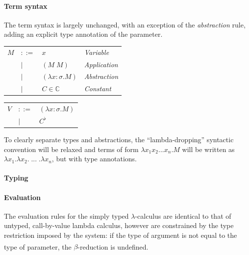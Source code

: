 \documentclass[table, a4paper, 10pt]{book}
\newcommand{\cit}[1]{\textsuperscript{\cite{#1}}}
\begin{document}
\paragraph{Term syntax}
The term syntax is largely unchanged, with an exception of
the \textit{abstraction} rule, adding an explicit type annotation of the parameter.

\begin{tabular}{llll}
$M$ &$::=$             &$x$                 & {\small\hspace{0.2cm}\textit{Variable}}\\
    &\hspace{0.1cm}$|$ &$(M\;M)$            & {\small\hspace{0.2cm}\textit{Application}}\\
    &\hspace{0.1cm}$|$ &$(\lambda x{:}\sigma.M)$     & {\small\hspace{0.2cm}\textit{Abstraction}}\\
    &\hspace{0.1cm}$|$ &$C \in \mathbb{C}$  & {\small\hspace{0.2cm}\textit{Constant}}\\
\end{tabular}
\begin{tabular}{lll}
\hspace{11mm}$V$ &$::=$             &$(\lambda x{:}\sigma.M)$\\
\hspace{11mm}    &\hspace{0.1cm}$|$ &$C^\flat$  
\hspace{11mm}
\end{tabular}

\noindent
To clearly separate types and abstractions, the ``lambda-dropping'' syntactic convention will be relaxed
and terms of form $\lambda x_1 x_2 ... x_n.M$ will be written as $\lambda x_1.\lambda x_2.\;...\;.\lambda x_n$,
but with type annotations.

\paragraph{Typing}

\paragraph{Evaluation}
The evaluation rules for the simply typed $\lambda$-calculus are identical
to that of untyped, call-by-value lambda calculus,
however are constrained by the type restriction imposed by the system:
if the type of argument is not equal to the type of parameter, the $\beta$-reduction is undefined.\cit{zlatuska}
\end{document}
